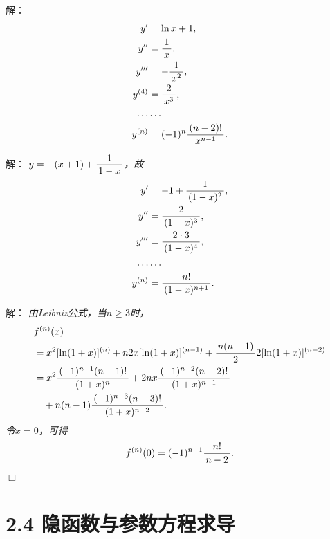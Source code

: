 \begin{frame}
	\linespread{1.5}
	\pause
	
	\bigskip
	
	\small 解：\it
	\begin{align*}
		y'&=\ln x+1,\\
		y''&=\displaystyle\frac{\,{1}\,}{\,{x}\,},\\
		y'''&=-\displaystyle\frac{\,{1}\,}{\,{x^2}\,},\\
		y^{(4)}&=\displaystyle\frac{\,{2}\,}{\,{x^3}\,},\\
		\ldots&\ldots\\
		y^{(n)}&=(-1)^n\displaystyle\frac{\,{(n-2)!}\,}{\,{x^{n-1}}\,}.
	\end{align*}
\end{frame}

\begin{frame}
	\linespread{1.5}
	\pause
	
	\bigskip
	
	\small 解：\it
	$y=-(x+1)+\displaystyle\frac{\,{1}\,}{\,{1-x}\,}$，故
	\begin{align*}
		y'&=-1+\displaystyle\frac{\,{1}\,}{\,{(1-x)^2}\,},\\
		y''&=\displaystyle\frac{\,{2}\,}{\,{(1-x)^3}\,},\\
		y'''&=\displaystyle\frac{\,{2\cdot 3}\,}{\,{(1-x)^4}\,},\\
		\ldots&\ldots\\
		y^{(n)}&=\displaystyle\frac{\,{n!}\,}{\,{(1-x)^{n+1}}\,}.
	\end{align*}
\end{frame}

\begin{frame}
	\linespread{1.5}
	\pause
	
	\bigskip
	
	\small 解：\it
	由Leibniz公式，当$n\geq3$时，
	\begin{align*}
		&f^{(n)}(x)\\
		&=x^2[\ln(1+x)]^{(n)}+n2x[\ln(1+x)]^{(n-1)}
		+\displaystyle\frac{\,{n(n-1)}\,}{\,{2}\,}2[\ln(1+x)]^{(n-2)}\\
		&=x^2\displaystyle\frac{\,{(-1)^{n-1}(n-1)!}\,}{\,{(1+x)^n}\,}+2nx\displaystyle\frac{\,{(-1)^{n-2}(n-2)!}\,}{\,{(1+x)^{n-1}}\,}\\
		&\quad +n(n-1)\displaystyle\frac{\,{(-1)^{n-3}(n-3)!}\,}{\,{(1+x)^{n-2}}\,}.
	\end{align*}
	\pause 令$x=0$，可得
	$$f^{(n)}(0)=(-1)^{n-1}\displaystyle\frac{\,{n!}\,}{\,{n-2}\,}.$$
	\hfill$\Box$
\end{frame}

\section{2.4 隐函数与参数方程求导}

